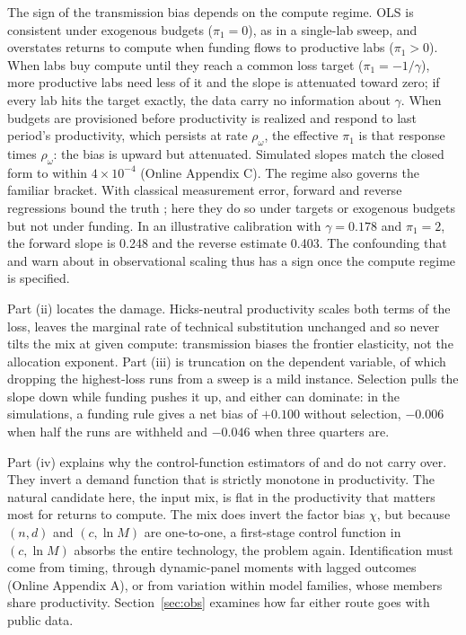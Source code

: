 The sign of the transmission bias depends on the compute regime. OLS is consistent under exogenous budgets
($\pi_1=0$), as in a single-lab sweep, and overstates returns to compute when funding flows to productive labs
($\pi_1>0$). When labs buy compute until they reach a common loss target ($\pi_1=-1/\gamma$), more productive labs need
less of it and the slope is attenuated toward zero; if every lab hits the target exactly, the data carry no information
about $\gamma$. When budgets are provisioned before productivity is realized and respond to last period's productivity,
which persists at rate $\rho_\omega$, the effective $\pi_1$ is that response times $\rho_\omega$: the bias is upward but
attenuated. Simulated slopes match the closed form to within $4\times10^{-4}$ (Online Appendix C). The regime also
governs the familiar bracket. With classical measurement error, forward and reverse regressions bound the truth
\citep{klepper1984consistent}; here they do so under targets or exogenous budgets but not under funding. In an
illustrative calibration with $\gamma=0.178$ and $\pi_1=2$, the forward slope is 0.248 and the reverse estimate 0.403. The confounding
that \citet{whitfill2025note} and \citet{konig2026validity} warn about in observational scaling thus has a sign once the
compute regime is specified.

Part (ii) locates the damage. Hicks-neutral productivity scales both terms of the loss, leaves the marginal rate of
technical substitution unchanged and so never tilts the mix at given compute: transmission biases the frontier
elasticity, not the allocation exponent. Part (iii) is truncation on the dependent variable, of which dropping the
highest-loss runs from a sweep \citep{besiroglu2024chinchilla} is a mild instance. Selection pulls the slope down while
funding pushes it up, and either can dominate: in the simulations, a funding rule gives a net bias of $+0.100$ without
selection, $-0.006$ when half the runs are withheld and $-0.046$ when three quarters are.

Part (iv) explains why the control-function estimators of \citet{olley1996dynamics} and \citet{levinsohn2003estimating}
do not carry over. They invert a demand function that is strictly monotone in productivity. The natural candidate here,
the input mix, is flat in the productivity that matters most for returns to compute. The mix does invert the factor bias
$\chi$, but because $(n,d)$ and $(c,\ln M)$ are one-to-one, a first-stage control function in $(c,\ln M)$ absorbs the
entire technology, the \citet{ackerberg2015identification} problem again. Identification must come from timing, through
dynamic-panel moments with lagged outcomes (Online Appendix A), or from variation within model families, whose members
share productivity. Section~\ref{sec:obs} examines how far either route goes with public data.

